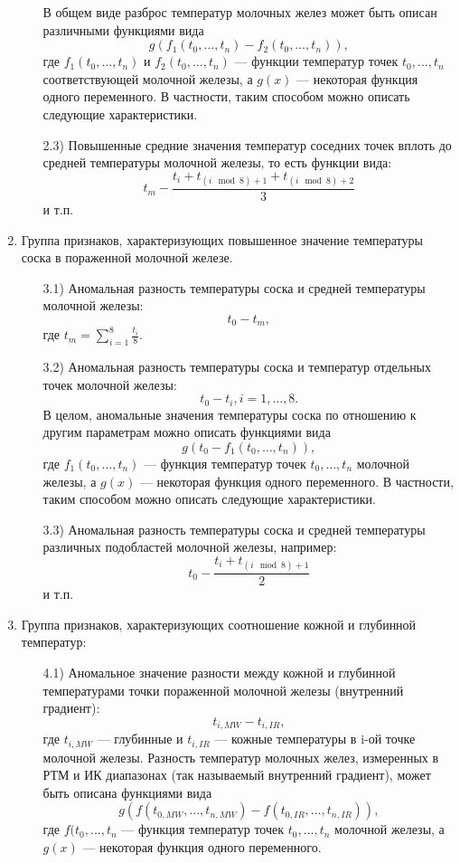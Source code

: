 \begin{enumerate}
\begin{enumerate}
        В общем виде разброс температур молочных желез может быть описан различными функциями
        вида
        \[g(f_{1}(t_{0}, \dots, t_{n}) - f_{2}(t_{0}, \dots,
        t_{n})),\]
        где \(f_{1}(t_{0}, \dots, t_{n})\) и \(f_{2}(t_{0}, \dots, t_{n})\) --- функции
        температур точек \(t_{0}, \dots, t_{n}\) соответствующей молочной железы, а \(g(x)\) ---         некоторая функция одного переменного. В частности, таким способом можно описать
        следующие характеристики.
        \item[2.3)] Повышенные средние значения температур соседних точек вплоть до средней температуры молочной железы, то есть функции вида:
        \[t_{m} - \frac{t_{i} + t_{(i \mod 8) + 1} + t_{(i \mod 8) + 2}}{3} \]
        и т.п.
    \end{enumerate}
    \item Группа признаков, характеризующих повышенное значение температуры соска в пораженной молочной железе.
    \begin{enumerate}
        \item[3.1)] Аномальная разность температуры соска и средней температуры молочной железы:
        \[t_{0} - t_{m},\]
        где \(t_{m} = \sum_{i=1}^{8}\frac{t_{i}}{8}\).
        \item[3.2)] Аномальная разность температуры соска и температур отдельных точек молочной железы:
        \[t_{0} - t_{i}, i = 1, \dots, 8. \]
        В целом, аномальные значения температуры соска по отношению к другим параметрам можно описать функциями вида
        \[g(t_{0} - f_{1}(t_{0}, \dots, t_{n})),\]
        где \(f_{1}(t_{0}, \dots, t_{n})\) --- функция температур точек \(t_{0}, \dots, t_{n}\) молочной железы, а \(g(x)\) --- некоторая функция одного переменного. В частности, таким способом можно описать следующие характеристики.
        \item[3.3)] Аномальная разность температуры соска и средней температуры различных подобластей молочной железы, например:
        \[t_{0} - \frac{t_{i} + t_{(i \mod 8) + 1}}{2} \]
        и т.п.
    \end{enumerate}
    \item Группа признаков, характеризующих соотношение кожной и глубинной температур:
    \begin{enumerate}
        \item[4.1)] Аномальное значение разности между кожной и глубинной температурами точки пораженной молочной железы (внутренний градиент):
        \[t_{i, MW}-t_{i, IR},\]
        где \(t_{i, MW}\) --- глубинные и \(t_{i, IR}\) --- кожные температуры в i-ой точке молочной железы.
        Разность температур молочных желез, измеренных в РТМ и ИК диапазонах (так называемый
        внутренний градиент), может быть описана функциями вида
        \[g(f(t_{0, MW}, \dots, t_{n, MW}) - f(t_{0, IR}, \dots, t_{n,
        IR})),\]
        где \(f(t_{0}, \dots, t_{n}\) --- функция температур точек \(t_{0}, \dots, t_{n}\) молочной железы, а \(g(x)\) --- некоторая функция одного переменного.


\end{enumerate}
\end{enumerate}
